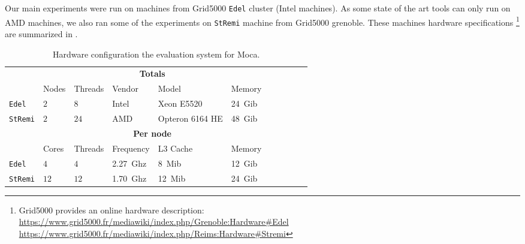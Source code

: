 Our main experiments were run on  machines from \gls{Grid5000} \texttt{Edel}
cluster (Intel machines).
As some state of the art tools can only run on \gls{AMD} machines, we also ran
    some of the experiments on
    \texttt{StRemi} machine from \gls{Grid5000} grenoble.
    These machines hardware specifications%
    \footnote{\gls{Grid5000} provides an online hardware description:\\
       \url{https://www.grid5000.fr/mediawiki/index.php/Grenoble:Hardware\#Edel}
       \\\url{https://www.grid5000.fr/mediawiki/index.php/Reims:Hardware\#Stremi}}
    are summarized in .

\begin{table}[htb]
    \centering
    \begin{tabular}{lllllllllll}
        \toprule
        & \multicolumn{5}{c}{\textbf{Totals}}\\
        \cmidrule(lr){2-6}
        & Nodes & Threads & Vendor & Model & Memory \\
        \cmidrule(lr){2-6}
        \texttt{Edel}    & $2$ & $8$  & Intel & Xeon E5520      & \SI{24}{Gib} \\
        \texttt{StRemi} & $2$ & $24$ & AMD   & Opteron 6164 HE & \SI{48}{Gib} \\
        \midrule
        & \multicolumn{5}{c}{\textbf{Per node}}\\
        \cmidrule(lr){2-6}
        & Cores & Threads & Frequency & L3 Cache & Memory \\
        \cmidrule(lr){2-6}
        \texttt{Edel}   & $4$  & $4$   & \SI{2.27}{Ghz}& \SI{8}{Mib}  & \SI{12}{Gib} \\
        \texttt{StRemi} & $12$ & $12$  & \SI{1.70}{Ghz}& \SI{12}{Mib} & \SI{24}{Gib}\\
        \bottomrule
    \end{tabular}
    \caption{Hardware configuration the evaluation system for Moca.}
    \label{tab:hw-moca}
\end{table}

